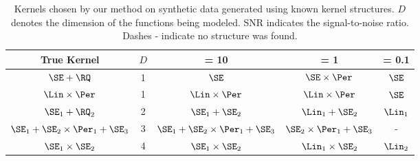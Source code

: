 %
%
\begin{table}[ht!]
\caption[Kernels chosen on synthetic data generated using known kernel structures]
{%
Kernels chosen by our method on synthetic data generated using known kernel structures. $D$ denotes the dimension of the functions being modeled.  SNR indicates the signal-to-noise ratio. Dashes - indicate no structure was found.
}
\label{tbl:synthetic}
\begin{center}
{\small
\begin{tabular}{c c | c c c}
True Kernel & $D$ & \SNR{} = 10 & \SNR{} = 1 & \hspace{-1cm} \SNR{} = 0.1 \\
\hline
$\SE + \RQ$                               & 1 
                                              & $\SE$
                                              & $\SE \times \Per$
                                              & $\SE$
                                              \\
$\Lin \times \Per$                        & 1 
                                              & $\Lin \times \Per$
                                              & $\Lin \times \Per$
                                              & $\SE$
                                              \\
$\SE_1 + \RQ_2$                           & 2 
                                              & $\SE_1 + \SE_2$
                                              & $\Lin_1 + \SE_2$ 
                                              & $\Lin_1$
                                              \\
$\SE_1 + \SE_2 \times \Per_1 + \SE_3$     & 3 
                                              & $\SE_1 + \SE_2 \times \Per_1 + \SE_3$
                                              & $\SE_2 \times \Per_1 + \SE_3$
                                              & -
                                              \\
$\SE_1 \times \SE_2$                      & 4 
                                              & $\SE_1 \times \SE_2$
                                              & $\Lin_1 \times \SE_2$
                                              & $\Lin_2$

\end{tabular}}
\end{center}
\end{table}
